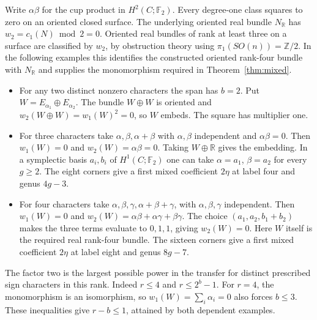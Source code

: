Write \(\alpha\beta\) for the cup product in \(H^2(C;\mathbb F_2)\). Every degree-one class squares to zero on an oriented closed surface. The underlying oriented real bundle \(N_{\mathbb R}\) has \(w_2=c_1(N)\bmod 2=0\). Oriented real bundles of rank at least three on a surface are classified by \(w_2\), by obstruction theory using \(\pi_1(SO(n))=\mathbb Z/2\). In the following examples this identifies the constructed oriented rank-four bundle with \(N_{\mathbb R}\) and supplies the monomorphism required in Theorem~\ref{thm:mixed}.

\begin{itemize}
\tightlist
\item
  For any two distinct nonzero characters the span has \(b=2\). Put \(W=E_{\alpha_1}\oplus E_{\alpha_2}\). The bundle \(W\oplus W\) is oriented and \(w_2(W\oplus W)=w_1(W)^2=0\), so \(W\) embeds. The square has multiplier one.
\item
  For three characters take \(\alpha,\beta,\alpha+\beta\) with \(\alpha,\beta\) independent and \(\alpha\beta=0\). Then \(w_1(W)=0\) and \(w_2(W)=\alpha\beta=0\). Taking \(W\oplus\mathbb R\) gives the embedding. In a symplectic basis \(a_i,b_i\) of \(H^1(C;\mathbb F_2)\) one can take \(\alpha=a_1\), \(\beta=a_2\) for every \(g\ge2\). The eight corners give a first mixed coefficient \(2\eta\) at label four and genus \(4g-3\).
\item
  For four characters take \(\alpha,\beta,\gamma,\alpha+\beta+\gamma\), with \(\alpha,\beta,\gamma\) independent. Then \(w_1(W)=0\) and \(w_2(W)=\alpha\beta+\alpha\gamma+\beta\gamma\). The choice \((a_1,a_2,b_1+b_2)\) makes the three terms evaluate to \(0,1,1\), giving \(w_2(W)=0\). Here \(W\) itself is the required real rank-four bundle. The sixteen corners give a first mixed coefficient \(2\eta\) at label eight and genus \(8g-7\).
\end{itemize}

The factor two is the largest possible power in the transfer for distinct prescribed sign characters in this rank. Indeed \(r\le4\) and \(r\le2^b-1\). For \(r=4\), the monomorphism is an isomorphism, so \(w_1(W)=\sum_i\alpha_i=0\) also forces \(b\le3\). These inequalities give \(r-b\le1\), attained by both dependent examples.
